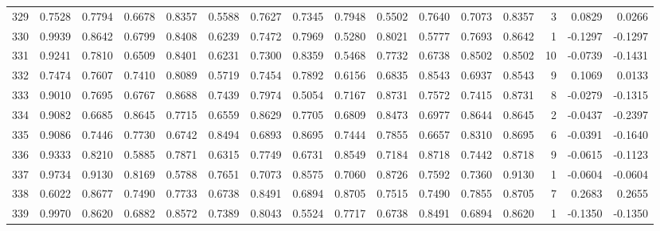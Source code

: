 \begin{tabular}{lrrrrrrrrrrrrrrr}
329 &      0.7528 &  0.7794 &  0.6678 &  0.8357 &  0.5588 &  0.7627 &  0.7345 &  0.7948 &  0.5502 &  0.7640 &   0.7073 &     0.8357 &      3 &                    0.0829 &                     0.0266 \\
330 &      0.9939 &  0.8642 &  0.6799 &  0.8408 &  0.6239 &  0.7472 &  0.7969 &  0.5280 &  0.8021 &  0.5777 &   0.7693 &     0.8642 &      1 &                   -0.1297 &                    -0.1297 \\
331 &      0.9241 &  0.7810 &  0.6509 &  0.8401 &  0.6231 &  0.7300 &  0.8359 &  0.5468 &  0.7732 &  0.6738 &   0.8502 &     0.8502 &     10 &                   -0.0739 &                    -0.1431 \\
332 &      0.7474 &  0.7607 &  0.7410 &  0.8089 &  0.5719 &  0.7454 &  0.7892 &  0.6156 &  0.6835 &  0.8543 &   0.6937 &     0.8543 &      9 &                    0.1069 &                     0.0133 \\
333 &      0.9010 &  0.7695 &  0.6767 &  0.8688 &  0.7439 &  0.7974 &  0.5054 &  0.7167 &  0.8731 &  0.7572 &   0.7415 &     0.8731 &      8 &                   -0.0279 &                    -0.1315 \\
334 &      0.9082 &  0.6685 &  0.8645 &  0.7715 &  0.6559 &  0.8629 &  0.7705 &  0.6809 &  0.8473 &  0.6977 &   0.8644 &     0.8645 &      2 &                   -0.0437 &                    -0.2397 \\
335 &      0.9086 &  0.7446 &  0.7730 &  0.6742 &  0.8494 &  0.6893 &  0.8695 &  0.7444 &  0.7855 &  0.6657 &   0.8310 &     0.8695 &      6 &                   -0.0391 &                    -0.1640 \\
336 &      0.9333 &  0.8210 &  0.5885 &  0.7871 &  0.6315 &  0.7749 &  0.6731 &  0.8549 &  0.7184 &  0.8718 &   0.7442 &     0.8718 &      9 &                   -0.0615 &                    -0.1123 \\
337 &      0.9734 &  0.9130 &  0.8169 &  0.5788 &  0.7651 &  0.7073 &  0.8575 &  0.7060 &  0.8726 &  0.7592 &   0.7360 &     0.9130 &      1 &                   -0.0604 &                    -0.0604 \\
338 &      0.6022 &  0.8677 &  0.7490 &  0.7733 &  0.6738 &  0.8491 &  0.6894 &  0.8705 &  0.7515 &  0.7490 &   0.7855 &     0.8705 &      7 &                    0.2683 &                     0.2655 \\
339 &      0.9970 &  0.8620 &  0.6882 &  0.8572 &  0.7389 &  0.8043 &  0.5524 &  0.7717 &  0.6738 &  0.8491 &   0.6894 &     0.8620 &      1 &                   -0.1350 &                    -0.1350 \\

\end{tabular}
